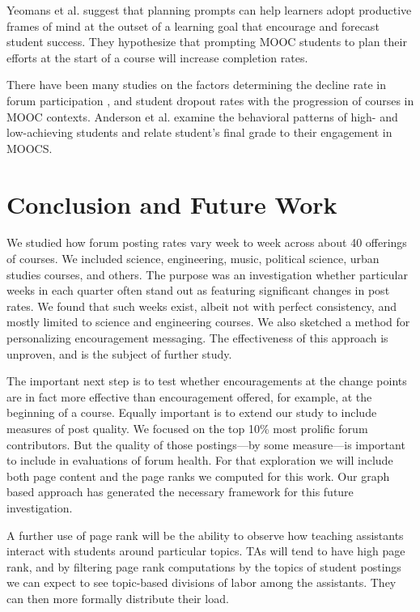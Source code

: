 Yeomans et al. \cite{Yeomans} suggest that planning prompts can help
learners adopt productive frames of mind at the outset of a learning
goal that encourage and forecast student success. They hypothesize
that prompting MOOC students to plan their efforts at the start of a
course will increase completion rates.

There have been many studies on the factors determining the decline
rate in forum participation \cite{DBLP}, and student dropout rates
\cite{Yang_peerinfluence} with the progression of courses in MOOC
contexts. Anderson et al. \cite{DBLP:journals/corr/AndersonHKL14}
examine the behavioral patterns of high- and low-achieving students
and relate student's final grade to their engagement in MOOCS.

\section{Conclusion and Future Work}

We studied how forum posting rates vary week to week across about 40
offerings of courses. We included science, engineering, music,
political science, urban studies courses, and others. The purpose was
an investigation whether particular weeks in each quarter often stand
out as featuring significant changes in post rates. We found that such
weeks exist, albeit not with perfect consistency, and mostly limited
to science and engineering courses. We also sketched a method for
personalizing encouragement messaging. The effectiveness of this
approach is unproven, and is the subject of further study.

The important next step is to test whether encouragements at the
change points are in fact more effective than encouragement offered,
for example, at the beginning of a course. Equally important is to
extend our study to include measures of post quality. We focused on
the top 10\% most prolific forum contributors. But the quality of
those postings---by some measure---is important to include in
evaluations of forum health. For that exploration we will include both
page content and the page ranks we computed for this work.  Our graph
based approach has generated the necessary framework for this future
investigation.

A further use of page rank will be the ability to observe how teaching
assistants interact with students around particular topics. TAs will
tend to have high page rank, and by filtering page rank computations
by the topics of student postings we can expect to see topic-based
divisions of labor among the assistants. They can then more formally
distribute their load.

